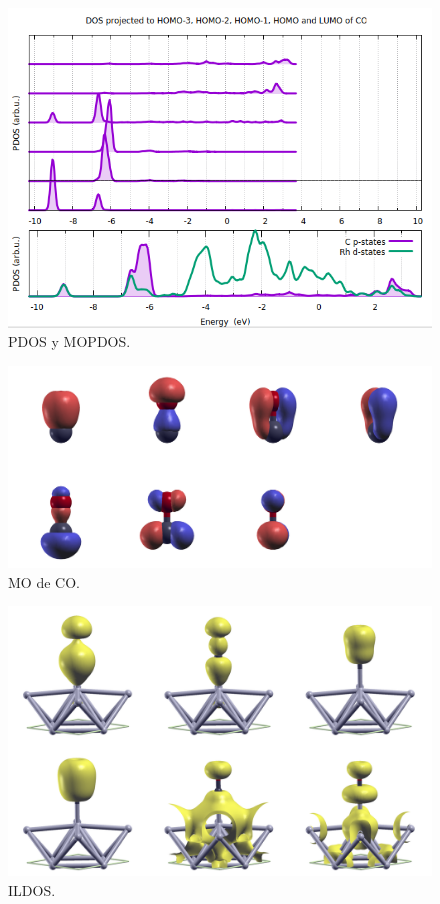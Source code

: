     \begin{figure}[H]
        \centering
        \includegraphics[scale = 0.5]{figs/D3/CO_DOS.png}
        \caption{PDOS y MOPDOS.}
    \end{figure}

    \begin{figure}[H]
        \centering
        \includegraphics[scale = 0.5]{figs/D3/psi2-montage.png}
        \caption{MO de CO.}
    \end{figure}

    \begin{figure}[H]
        \centering
        \includegraphics[scale = 0.5]{figs/D3/ildos-montage.png}
        \caption{ILDOS.}
    \end{figure}

